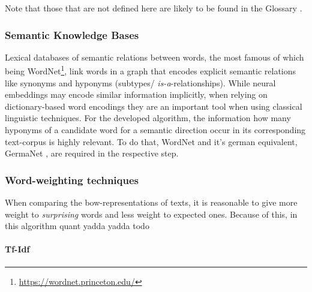 Note that those that are not defined here are likely to be found in the Glossary .

\subsubsection*{Semantic Knowledge Bases}

Lexical databases of semantic relations between words, the most famous of which being WordNet\footnote{\url{https://wordnet.princeton.edu/}}, link words in a graph that encodes explicit semantic relations like synonyms and hyponyms (subtypes/ \emph{is-a}-relationships). While neural %
embeddings may encode similar information implicitly, when relying on dictionary-based word encodings they are an important tool when using classical linguistic techniques. For the developed algorithm, the information how many hyponyms of a candidate word for a semantic direction %
occur in its corresponding text-corpus is highly relevant. To do that, WordNet \cite{Miller1995} and it's german equivalent, GermaNet \cite{hamp-feldweg-1997-germanet,Henrich}, are required in the respective step.


\subsubsection*{Word-weighting techniques}

\label{sec:word_count_techniques}

When comparing the \gls{bow}-representations of texts, it is reasonable to give more weight to \emph{surprising} words and less weight to expected ones.  \cite[156]{Turney2010} Because of this, in this algorithm  \gls{quant} yadda yadda todo

\paragraph{Tf-Idf}

